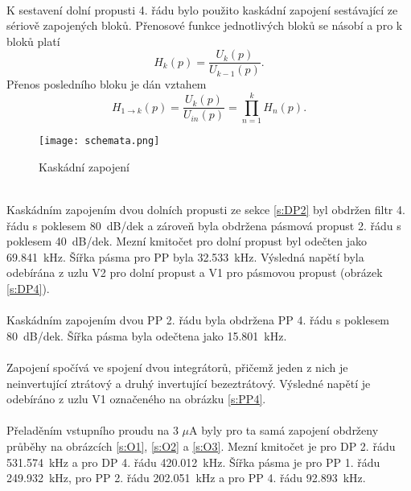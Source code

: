 \\
\noindent K sestavení dolní propusti 4. řádu bylo použito kaskádní zapojení sestávající ze sériově zapojených bloků. Přenosové funkce jednotlivých bloků se násobí a pro k bloků platí
\begin{equation}
H_k(p) = \frac{U_k (p)}{U_{k-1}(p)}.
\end{equation}
Přenos posledního bloku je dán vztahem
\begin{equation}
H_{1 \rightarrow k}(p) = \frac{U_k (p)}{U_{in}(p)} = \prod _{n=1}^{k} H_n(p).
\end{equation}
\begin{figure}[h]
\centering
\texttt{[image: schemata.png]}
\caption[Kaskádní zapojení]{Kaskádní zapojení \cite{12}}
\end{figure}
\\
\noindent Kaskádním zapojením dvou dolních propusti ze sekce \ref{s:DP2} byl obdržen filtr 4. řádu s poklesem 80~dB/dek a zároveň byla obdržena pásmová propust 2. řádu s poklesem 40~dB/dek. Mezní kmitočet pro dolní propust byl odečten jako 69.841~kHz. Šířka pásma pro PP byla 32.533~kHz. Výsledná napětí byla odebírána z uzlu V2 pro dolní propust a V1 pro pásmovou propust (obrázek \ref{s:DP4}). \\
\\
\noindent Kaskádním zapojením dvou PP 2. řádu byla obdržena PP 4. řádu s poklesem 80~dB/dek. Šířka pásma byla odečtena jako 15.801~kHz.\\ 
\\
Zapojení spočívá ve spojení dvou integrátorů, přičemž jeden z nich je neinvertující ztrátový a druhý invertující bezeztrátový. Výsledné napětí je odebíráno z uzlu V1 označeného na obrázku \ref{s:PP4}.\\
\\
\noindent Přeladěním vstupního proudu na 3 $\mu$A byly pro ta samá zapojení obdrženy průběhy na obrázcích \ref{s:O1}, \ref{s:O2} a  \ref{s:O3}. Mezní kmitočet je pro DP 2. řádu 531.574~kHz a pro DP 4. řádu 420.012~kHz. Šířka pásma je pro PP 1. řádu 249.932~kHz, pro PP 2. řádu 202.051~kHz a pro PP 4. řádu 92.893~kHz.